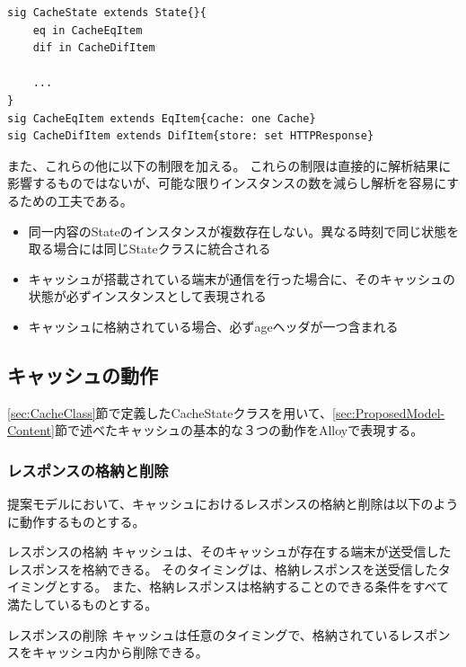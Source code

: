 \documentclass[journal]{IEEEtran}
\begin{document}
\begin{lstlisting}[caption=キャッシュの状態を表すクラス, label=code:CacheStateClass]
sig CacheState extends State{}{
	eq in CacheEqItem
	dif in CacheDifItem

	...
}
sig CacheEqItem extends EqItem{cache: one Cache}
sig CacheDifItem extends DifItem{store: set HTTPResponse}
\end{lstlisting}

また、これらの他に以下の制限を加える。
これらの制限は直接的に解析結果に影響するものではないが、可能な限りインスタンスの数を減らし解析を容易にするための工夫である。

\begin{itemize}
\item 同一内容のStateのインスタンスが複数存在しない。異なる時刻で同じ状態を取る場合には同じStateクラスに統合される
\item キャッシュが搭載されている端末が通信を行った場合に、そのキャッシュの状態が必ずインスタンスとして表現される
\item キャッシュに格納されている場合、必ずageヘッダが一つ含まれる
\end{itemize}

\subsection{キャッシュの動作}
\ref{sec:CacheClass}節で定義したCacheStateクラスを用いて、\ref{sec:ProposedModel-Content}節で述べたキャッシュの基本的な３つの動作をAlloyで表現する。

\subsubsection{レスポンスの格納と削除}
提案モデルにおいて、キャッシュにおけるレスポンスの格納と削除は以下のように動作するものとする。

\begin{itembox}[l]{レスポンスの格納}
キャッシュは、そのキャッシュが存在する端末が送受信したレスポンスを格納できる。
そのタイミングは、格納レスポンスを送受信したタイミングとする。
また、格納レスポンスは格納することのできる条件をすべて満たしているものとする。
\end{itembox}

\begin{itembox}[l]{レスポンスの削除}
キャッシュは任意のタイミングで、格納されているレスポンスをキャッシュ内から削除できる。
\end{itembox}
\end{document}
